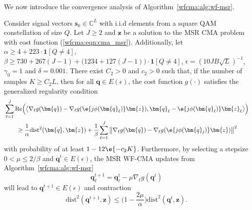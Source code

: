 We now introduce the convergence analysis of Algorithm~\ref{wfcma:alg:wf-msr}. 
\begin{thm2} \label{wfcma:thm:convergence_msr}
Consider signal vectors $\bm{s}_k\in\mathbb{C}^L$ with i.i.d elements from a square QAM constellation of size $Q$. Let $J\geq2$ and $\bm{z}$ be a solution to the MSR CMA problem with cost function (\ref{wfcma:eqn:cma_msr}). Additionally, let $\alpha\geq4+223\cdot\bm{1}[Q\neq4]$, $\beta\geq 730+267(J-1)+\big(1234+127(J-1)\big)\cdot\bm{1}[Q\neq4]$, $\epsilon=(10JB\sqrt{L})^{-1}$, $\gamma_0=1$ and $\delta=0.001$. There exist $C_2>0$ and $c_2>0$ such that, if the number of samples $K\geq C_2 L$, then for all $\bm{q}\in E(\epsilon)$, the cost function $g(\cdot)$ satisfies the generalized regularity condition
\begin{align}
	&\sum_{\ell=1}^J\mathrm{Re}\Big( \big\langle\nabla_{\ell} g(\bm{q})-\nabla_{\ell} g(\e{j\phi(\bm{q}_{\ell})}\bm{z}), \bm{q}_{\ell} - \e{j\phi(\bm{q}_{\ell})}\bm{z}_{\ell}\big\rangle\Big)
	\nonumber\\ &\qquad
	\geq\frac{1}{\alpha}\mathrm{dist}^2(\bm{q},\bm{z}) + \frac{1}{\beta}\sum_{\ell=1}^J\big\|\nabla_{\ell} g(\bm{q})-\nabla_{\ell} g(\e{j\phi(\bm{q}_{\ell})}\bm{z})\big\|^2 \label{wfcma:eqn:regularity_condition_msr}
\end{align}
with probability of at least $1 -12\e{-c_2K}$.
Furthermore, by selecting a stepsize $0 < \mu \leq 2/\beta$ and $\bm{q}^{t}\in E(\epsilon)$, the MSR WF-CMA updates from Algorithm~\ref{wfcma:alg:wf-msr}
\begin{equation}
	\bm{q}_{\ell}^{t+1} = \bm{q}_{\ell}^t - \mu\nabla_{\ell} g(\bm{q}^t )
\end{equation}
will lead to $\bm{q}^{t+1}\in E(\epsilon)$ and contraction
\begin{equation}
	\mathrm{dist}^2	(\bm{q}^{t+1} ,\bm{z}) \leq \Big(1 -\frac{2\mu}{\alpha}\Big) \mathrm{dist}^2	(\bm{q}^t,\bm{z}). \label{wfcma:eqn:contraction_thm_msr}
\end{equation}
\end{thm2}

